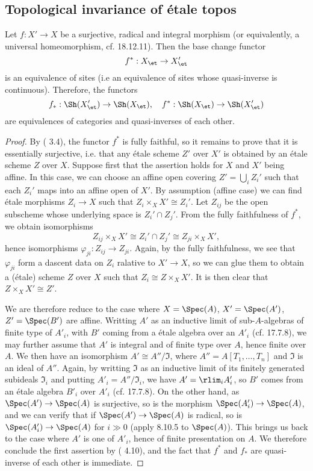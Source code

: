 \subsection{Topological invariance of \'etale topos}
\begin{theorem}\label{scheme etale site equivalence if integral surj radical}
Let $f:X'\to X$ be a surjective, radical and integral morphism (or equivalently, a universal homeomorphism, cf. \cite{EGA4-4} 18.12.11). Then the base change functor
\[f^*:X_\et\to X'_\et\]
is an equivalence of sites (i.e an equivalence of sites whose quasi-inverse is continuous). Therefore, the functors
\[f_*:\Sh(X'_\et)\to\Sh(X_\et),\quad f^*:\Sh(X_\et)\to\Sh(X'_\et)\] 
are equivalences of categories and quasi-inverses of each other.
\end{theorem}
\begin{proof}
By (\cite{SGA1}  3.4), the functor $f^*$ is fully faithful, so it remains to prove that it is essentially surjective, i.e. that any \'etale scheme $Z'$ over $X'$ is obtained by an \'etale scheme $Z$ over $X$. Suppose first that the assertion holds for $X$ and $X'$ being affine. In this case, we can choose an affine open covering $Z'=\bigcup_iZ_i'$ such that each $Z_i'$ maps into an affine open of $X'$. By assumption (affine case) we can find \'etale morphisms $Z_i\to X$ such that $Z_i\times_XX'\cong Z_i'$. Let $Z_{ij}$ be the open subscheme whose underlying space is $Z_i'\cap Z_j'$. From the fully faithfulness of $f^*$, we obtain isomorphisms
\[Z_{ij}\times_XX'\cong Z_i'\cap Z_j'\cong Z_{ji}\times_XX',\]
hence isomorphisms $\varphi_{ji}:Z_{ij}\to Z_{ji}$. Again, by the fully faithfulness, we see that $\varphi_{ji}$ form a dascent data on $Z_i$ ralative to $X'\to X$, so we can glue them to obtain a (\'etale) scheme $Z$ over $X$ such that $Z_i\cong Z\times_XX'$. It is then clear that $Z\times_XX'\cong Z'$.\par
We are therefore reduce to the case where $X=\Spec(A)$, $X'=\Spec(A')$, $Z'=\Spec(B')$ are affine. Writting $A'$ as an inductive limit of sub-$A$-algebras of finite type of $A'_i$, with $B'$ coming from a \'etale algebra over an $A'_i$ (cf. \cite{EGA4-4} 17.7.8), we may further assume that $A'$ is integral and of finite type over $A$, hence finite over $A$. We then have an isomorphism $A'\cong A''/\mathfrak{I}$, where $A''=A[T_1,\dots,T_n]$ and $\mathfrak{I}$ is an ideal of $A''$. Again, by writting $\mathfrak{I}$ as an inductive limit of its finitely generated subideals $\mathfrak{I}_i$ and putting $A'_i=A''/\mathfrak{I}_i$, we have $A'=\rlim_iA'_i$, so $B'$ comes from an \'etale algebra $B'_i$ over $A'_i$ (cf. \cite{EGA4-4} 17.7.8). On the other hand, as $\Spec(A')\to\Spec(A)$ is surjective, so is the morphism $\Spec(A'_i)\to\Spec(A)$, and we can verify that if $\Spec(A')\to\Spec(A)$ is radical, so is $\Spec(A'_i)\to\Spec(A)$ for $i\gg 0$ (apply \cite{EGA4-3} 8.10.5 to $\Spec(A)$). This brings us back to the case where $A'$ is one of $A'_i$, hence of finite presentation on $A$. We therefore conclude the first assertion by (\cite{SGA1}  4.10), and the fact that $f^*$ and $f_*$ are quasi-inverse of each other is immediate.
\end{proof}
